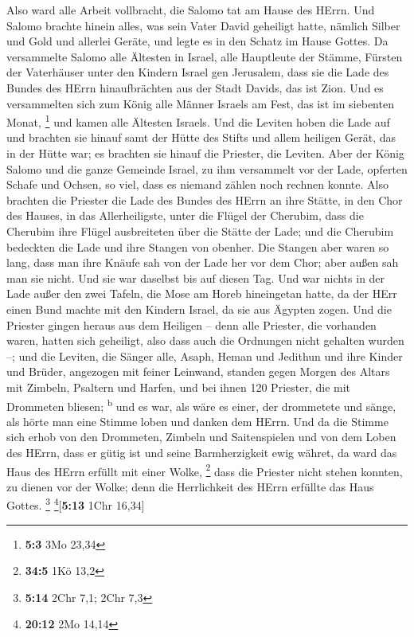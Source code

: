  Also ward alle Arbeit vollbracht, die Salomo tat am Hause
des HErrn. Und Salomo brachte hinein alles, was sein Vater David
geheiligt hatte, nämlich Silber und Gold und allerlei Geräte, und legte
es in den Schatz im Hause Gottes.  Da versammelte Salomo
alle Ältesten in Israel, alle Hauptleute der Stämme, Fürsten der
Vaterhäuser unter den Kindern Israel gen Jerusalem, dass sie die Lade
des Bundes des HErrn hinaufbrächten aus der Stadt Davids, das ist Zion.
 Und es versammelten sich zum König alle Männer Israels am
Fest, das ist im siebenten Monat, \footnote{\textbf{5:3} 3Mo 23,34}
 und kamen alle Ältesten Israels. Und die Leviten hoben
die Lade auf  und brachten sie hinauf samt der Hütte des
Stifts und allem heiligen Gerät, das in der Hütte war; es brachten sie
hinauf die Priester, die Leviten.  Aber der König Salomo
und die ganze Gemeinde Israel, zu ihm versammelt vor der Lade, opferten
Schafe und Ochsen, so viel, dass es niemand zählen noch rechnen konnte.
 Also brachten die Priester die Lade des Bundes des HErrn
an ihre Stätte, in den Chor des Hauses, in das Allerheiligste, unter die
Flügel der Cherubim,  dass die Cherubim ihre Flügel
ausbreiteten über die Stätte der Lade; und die Cherubim bedeckten die
Lade und ihre Stangen von obenher.  Die Stangen aber waren
so lang, dass man ihre Knäufe sah von der Lade her vor dem Chor; aber
außen sah man sie nicht. Und sie war daselbst bis auf diesen Tag.
 Und war nichts in der Lade außer den zwei Tafeln, die
Mose am Horeb hineingetan hatte, da der HErr einen Bund machte mit den
Kindern Israel, da sie aus Ägypten zogen.  Und die
Priester gingen heraus aus dem Heiligen -- denn alle Priester, die
vorhanden waren, hatten sich geheiligt, also dass auch die Ordnungen
nicht gehalten wurden --;  und die Leviten, die Sänger
alle, Asaph, Heman und Jedithun und ihre Kinder und Brüder, angezogen
mit feiner Leinwand, standen gegen Morgen des Altars mit Zimbeln,
Psaltern und Harfen, und bei ihnen 120 Priester, die mit Drommeten
bliesen; \textsuperscript{b}  und es war, als wäre es
einer, der drommetete und sänge, als hörte man eine Stimme loben und
danken dem HErrn. Und da die Stimme sich erhob von den Drommeten,
Zimbeln und Saitenspielen und von dem Loben des HErrn, dass er gütig ist
und seine Barmherzigkeit ewig währet, da ward das Haus des HErrn erfüllt
mit einer Wolke, \footnote{\textbf{34:5} 1Kö 13,2}  dass
die Priester nicht stehen konnten, zu dienen vor der Wolke; denn die
Herrlichkeit des HErrn erfüllte das Haus Gottes. \footnote{\textbf{5:14}
  2Chr 7,1; 2Chr 7,3} \footnote{\textbf{20:12} 2Mo 14,14}{[}\textbf{5:13}
1Chr 16,34{]}

